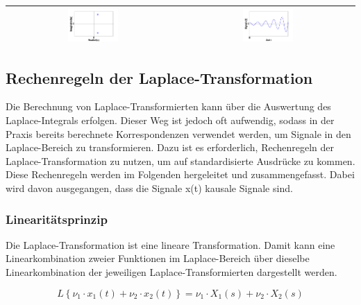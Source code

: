 \begin{table}[ht]
{\begin{tabular}{| c | c |}
\parbox[c][1.6in][c]{3.2in}{\centerline{\includegraphics[width=0.3\textwidth]{Kapitel3/Table/image11.png}}} & \parbox[c][1.6in][c]{3.2in}{\centerline{\includegraphics[width=0.3\textwidth]{Kapitel3/Table/image12.png}}}\\ \hline
\end{tabular}%
}
\label{tab:fourone}
\end{table}

\clearpage

\subsection{Rechenregeln der Laplace-Transformation}

\noindent Die Berechnung von Laplace-Transformierten kann über die Auswertung des Laplace-Integrals erfolgen. Dieser Weg ist jedoch oft aufwendig, sodass in der Praxis bereits berechnete Korrespondenzen verwendet werden, um Signale in den Laplace-Bereich zu transformieren. Dazu ist es erforderlich,
Rechenregeln der Laplace-Transformation zu nutzen, um auf standardisierte Ausdrücke zu kommen.
Diese Rechenregeln werden im Folgenden hergeleitet und zusammengefasst. Dabei wird davon ausgegangen, dass die Signale x(t) kausale Signale sind.

\subsubsection{Linearitätsprinzip}

\noindent Die Laplace-Transformation ist eine lineare Transformation. Damit kann eine Linearkombination zweier Funktionen im Laplace-Bereich über dieselbe Linearkombination der jeweiligen Laplace-Transformierten dargestellt werden.

\begin{equation}\label{eq:fourthirty}
L\left\{\nu _{1} \cdot x_{1} \left(t\right)+\nu _{2} \cdot x_{2} \left(t\right)\right\}=\nu _{1} \cdot X_{1} \left(s\right)+\nu _{2} \cdot X_{2} \left(s\right)
\end{equation}

